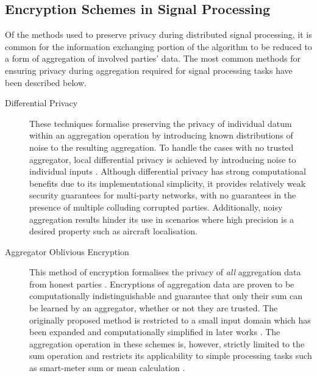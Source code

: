 \documentclass[twocolumn]{autart}
\begin{document}
\subsection{Encryption Schemes in Signal Processing}
Of the methods used to preserve privacy during distributed signal processing, it is common for the information exchanging portion of the algorithm to be reduced to a form of aggregation of involved parties' data. The most common methods for ensuring privacy during aggregation required for signal processing tasks have been described below.
\begin{description}
    \item[Differential Privacy] These techniques formalise preserving the privacy of individual datum within an aggregation operation by introducing known distributions of noise to the resulting aggregation. To handle the cases with no trusted aggregator, local differential privacy is achieved by introducing noise to individual inputs \cite{hanPrivacyControlDynamical2018,dworkDifferentialPrivacySurvey2008,andresGeoindistinguishabilityDifferentialPrivacy2013}. Although differential privacy has strong computational benefits due to its implementational simplicity, it provides relatively weak security guarantees for multi-party networks, with no guarantees in the presence of multiple colluding corrupted parties. Additionally, noisy aggregation results hinder its use in scenarios where high precision is a desired property such as aircraft localisation.
    \item[Aggregator Oblivious Encryption] This method of encryption formalises the privacy of \textit{all} aggregation data from honest parties \cite{shiPrivacyPreservingAggregationTimeSeries2011,chanPrivacyPreservingStreamAggregation2012,joyeScalableSchemePrivacyPreserving2013}. Encryptions of aggregation data are proven to be computationally indistinguishable and guarantee that only their sum can be learned by an aggregator, whether or not they are trusted. The originally proposed method \cite{shiPrivacyPreservingAggregationTimeSeries2011} is restricted to a small input domain which has been expanded and computationally simplified in later works \cite{joyeScalableSchemePrivacyPreserving2013,benhamoudaNewFrameworkPrivacyPreserving2016}. The aggregation operation in these schemes is, however, strictly limited to the sum operation and restricts its applicability to simple processing tasks such as smart-meter sum or mean calculation \cite{chanPrivacyPreservingStreamAggregation2012,benhamoudaNewFrameworkPrivacyPreserving2016}.
\end{description}
\end{document}
